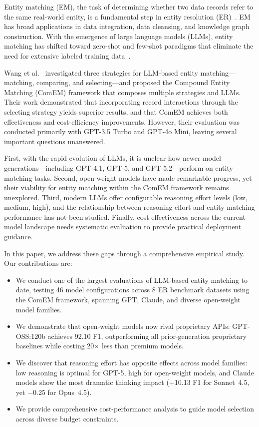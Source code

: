 \documentclass[runningheads]{llncs}
\begin{document}
Entity matching (EM), the task of determining whether two data records refer to the same real-world entity, is a fundamental step in entity resolution (ER)~\cite{fellegi1969theory,getoor2012entity}. EM has broad applications in data integration, data cleansing, and knowledge graph construction. With the emergence of large language models (LLMs), entity matching has shifted toward zero-shot and few-shot paradigms that eliminate the need for extensive labeled training data~\cite{narayan2022can,peeters2023using,peeters2025entity}.

Wang et al.~\cite{wang2025match} investigated three strategies for LLM-based entity matching---matching, comparing, and selecting---and proposed the Compound Entity Matching (ComEM) framework that composes multiple strategies and LLMs. Their work demonstrated that incorporating record interactions through the selecting strategy yields superior results, and that ComEM achieves both effectiveness and cost-efficiency improvements. However, their evaluation was conducted primarily with GPT-3.5 Turbo and GPT-4o Mini, leaving several important questions unanswered.

First, with the rapid evolution of LLMs, it is unclear how newer model generations---including GPT-4.1, GPT-5, and GPT-5.2---perform on entity matching tasks. Second, open-weight models have made remarkable progress, yet their viability for entity matching within the ComEM framework remains unexplored. Third, modern LLMs offer configurable reasoning effort levels (low, medium, high), and the relationship between reasoning effort and entity matching performance has not been studied. Finally, cost-effectiveness across the current model landscape needs systematic evaluation to provide practical deployment guidance.

In this paper, we address these gaps through a comprehensive empirical study. Our contributions are:

\begin{itemize}[leftmargin=*,itemsep=2pt]
    \item We conduct one of the largest evaluations of LLM-based entity matching to date, testing 46 model configurations across 8 ER benchmark datasets using the ComEM framework, spanning GPT, Claude, and diverse open-weight model families.
    \item We demonstrate that open-weight models now rival proprietary APIs: GPT-OSS:120b achieves 92.10 F1, outperforming all prior-generation proprietary baselines while costing 20$\times$ less than premium models.
    \item We discover that reasoning effort has opposite effects across model families: low reasoning is optimal for GPT-5, high for open-weight models, and Claude models show the most dramatic thinking impact (+10.13 F1 for Sonnet~4.5, yet $-$0.25 for Opus~4.5).
    \item We provide comprehensive cost-performance analysis to guide model selection across diverse budget constraints.
\end{itemize}
\end{document}
